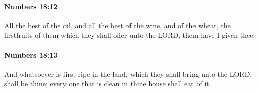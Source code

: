 		\paragraph{Numbers 18:12} %
			\label{NUMBERS-18-12}

			All the best of the oil, and all the best of the wine, and of the wheat, the firstfruits of them which they shall offer unto the LORD, them have I given thee.


		\paragraph{Numbers 18:13} %
			\label{NUMBERS-18-13}

			And whatsoever is first ripe in the land, which they shall bring unto the LORD, shall be thine; every one that is clean in thine house shall eat of it.


